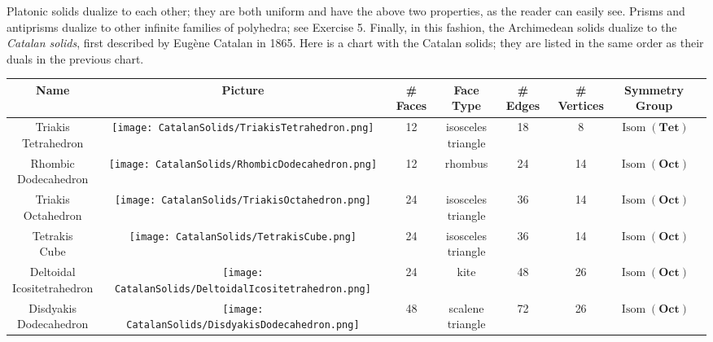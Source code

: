 \documentclass[leqno]{book}
\begin{document}
Platonic solids dualize to each other; they are both uniform and have the above two properties, as the reader can easily see.  Prisms and antiprisms dualize to other infinite families of polyhedra; see Exercise 5.  Finally, in this fashion, the Archimedean solids dualize to the \emph{Catalan solids}, first described by Eug\`ene Catalan in 1865.  Here is a chart with the Catalan solids; they are listed in the same order as their duals in the previous chart.
\begin{center}
\begin{tabular}{cccccccc}
Name&Picture&\# Faces&Face Type&\# Edges&\# Vertices&\parbox{2cm}{Symmetry\\Group}\\\hline\hline

\parbox{2.5cm}{Triakis\\Tetrahedron}&
\texttt{[image: CatalanSolids/TriakisTetrahedron.png]}&
12&
\parbox{2cm}{isosceles\\triangle}&
18&
8&
$\operatorname{Isom}(\mathbf{Tet})$\\\hline

\parbox{2.5cm}{Rhombic\\Dodecahedron}&
\texttt{[image: CatalanSolids/RhombicDodecahedron.png]}&
12&
rhombus&
24&
14&
$\operatorname{Isom}(\mathbf{Oct})$\\\hline

\parbox{2.5cm}{Triakis\\Octahedron}&
\texttt{[image: CatalanSolids/TriakisOctahedron.png]}&
24&
\parbox{2cm}{isosceles\\triangle}&
36&
14&
$\operatorname{Isom}(\mathbf{Oct})$\\\hline

\parbox{2.5cm}{Tetrakis\\Cube}&
\texttt{[image: CatalanSolids/TetrakisCube.png]}&
24&
\parbox{2cm}{isosceles\\triangle}&
36&
14&
$\operatorname{Isom}(\mathbf{Oct})$\\\hline

\parbox{2.5cm}{Deltoidal\\Icositetrahedron}&
\texttt{[image: CatalanSolids/DeltoidalIcositetrahedron.png]}&
24&
kite&
48&
26&
$\operatorname{Isom}(\mathbf{Oct})$\\\hline

\parbox{2.5cm}{Disdyakis\\Dodecahedron}&
\texttt{[image: CatalanSolids/DisdyakisDodecahedron.png]}&
48&
\parbox{2cm}{scalene\\triangle}&
72&
26&
$\operatorname{Isom}(\mathbf{Oct})$\\\hline


\end{tabular}
\end{center}
\end{document}
